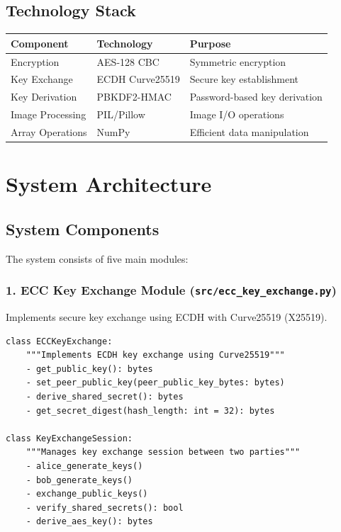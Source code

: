 \documentclass[12pt,a4paper]{report}
\begin{document}
\section{Technology Stack}

\begin{table}[H]
    \centering
    \begin{tabular}{|l|l|l|}
    \hline
    \textbf{Component} & \textbf{Technology} & \textbf{Purpose} \\
    \hline
    Encryption & AES-128 CBC & Symmetric encryption \\
    Key Exchange & ECDH Curve25519 & Secure key establishment \\
    Key Derivation & PBKDF2-HMAC & Password-based key derivation \\
    Image Processing & PIL/Pillow & Image I/O operations \\
    Array Operations & NumPy & Efficient data manipulation \\
    \hline
    \end{tabular}
\end{table}

\chapter{System Architecture}

\section{System Components}

The system consists of five main modules:

\subsection{1. ECC Key Exchange Module (\texttt{src/ecc\_key\_exchange.py})}

Implements secure key exchange using ECDH with Curve25519 (X25519).

\begin{lstlisting}[caption=ECC Key Exchange Classes]
class ECCKeyExchange:
    """Implements ECDH key exchange using Curve25519"""
    - get_public_key(): bytes
    - set_peer_public_key(peer_public_key_bytes: bytes)
    - derive_shared_secret(): bytes
    - get_secret_digest(hash_length: int = 32): bytes

class KeyExchangeSession:
    """Manages key exchange session between two parties"""
    - alice_generate_keys()
    - bob_generate_keys()
    - exchange_public_keys()
    - verify_shared_secrets(): bool
    - derive_aes_key(): bytes
\end{lstlisting}
\end{document}

